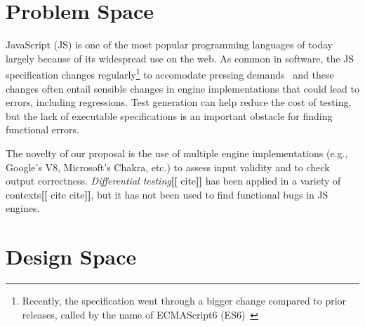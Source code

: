 \documentclass[11pt]{article}
\newcommand{\eg}{e.g.}
\newcommand{\Fix}[1]{\textbf{[[}{\color{red} #1}\textbf{]]}}
\newcommand{\Comment}[1]{}
\begin{document}
\section{Problem Space}



JavaScript (JS) is one of the most popular programming languages of
today~\cite{business-insider,stackify} largely because of its
widespread use on the web. As common in software, the JS specification
changes regularly\footnote{Recently, the specification went through a
  bigger change compared to prior releases, called by the name of
  ECMAScript6 (ES6)~\cite{es6-features}} to accomodate pressing
demands~\cite{kangax} and these changes often entail sensible changes
in engine implementations that could lead to errors, including
regressions.  Test generation can help reduce the cost of testing, but
the lack of executable specifications is an important obstacle for
finding functional errors.  

\begin{center}
\end{center}

The novelty of our proposal is the use of multiple engine
implementations (\eg{}, Google's V8, Microsoft's Chakra, etc.) to
assess input validity and to check output
correctness. \emph{Differential testing}\Fix{cite} has been applied in
a variety of contexts\Fix{cite cite}, but it has not been used to find
functional bugs in JS engines.

\section{Design Space}
\label{sec:design}
\end{document}

